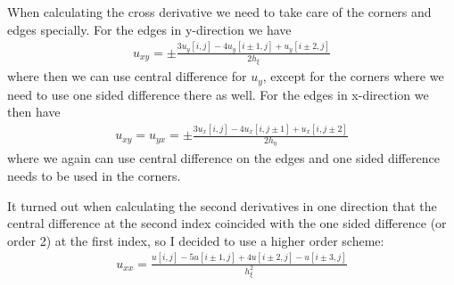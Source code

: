 \documentclass{setup}
\begin{document}
When calculating the cross derivative we need to take care of the corners and edges specially. For the edges in y-direction we have
\begin{align}
    u_{xy} = \pm\frac{3u_y[i,j] - 4u_y[i\pm1,j] + u_y[i\pm2,j]}{2h_\xi}
\end{align}
where then we can use central difference for $u_y$, except for the corners where we need to use one sided difference there as well. For the edges in x-direction
we then have
\begin{align}
    u_{xy} = u_{yx} = \pm\frac{3u_x[i,j] - 4u_x[i,j\pm1] + u_x[i,j\pm2] }{2h_\eta}
\end{align}
where we again can use central difference on the edges and one sided difference needs to be used in the corners.

It turned out when calculating the second derivatives in one direction that the central difference at the second index coincided with the one sided difference (or order 2) 
at the first index, so I decided to use a higher order scheme:
\begin{align}
    u_{xx} = \frac{u[i,j] - 5u[i\pm 1,j] + 4u[i\pm 2, j] - u[i\pm 3,j]}{h_\xi^2} 
\end{align}
\end{document}
